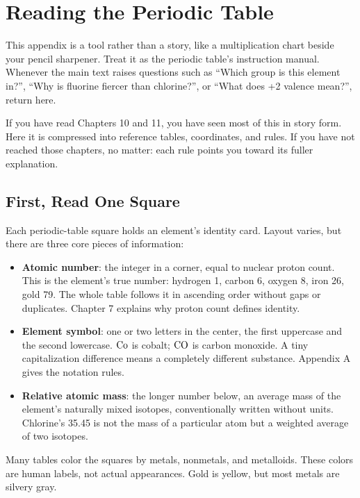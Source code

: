 \chapter{Reading the Periodic Table}

\begin{kaichang}
This appendix is a tool rather than a story, like a multiplication chart beside your pencil sharpener. Treat it as the periodic table's instruction manual. Whenever the main text raises questions such as ``Which group is this element in?'', ``Why is fluorine fiercer than chlorine?'', or ``What does +2 valence mean?'', return here.

If you have read Chapters 10 and 11, you have seen most of this in story form. Here it is compressed into reference tables, coordinates, and rules. If you have not reached those chapters, no matter: each rule points you toward its fuller explanation.
\end{kaichang}

\section{First, Read One Square}

Each periodic-table square holds an element's identity card. Layout varies, but there are three core pieces of information:

\begin{itemize}[itemsep=2pt]
\item \textbf{Atomic number}: the integer in a corner, equal to nuclear proton count. This is the element's true number: hydrogen 1, carbon 6, oxygen 8, iron 26, gold 79. The whole table follows it in ascending order without gaps or duplicates. Chapter 7 explains why proton count defines identity.
\item \textbf{Element symbol}: one or two letters in the center, the first uppercase and the second lowercase. $\mathrm{Co}$ is cobalt; $\mathrm{CO}$ is carbon monoxide. A tiny capitalization difference means a completely different substance. Appendix A gives the notation rules.
\item \textbf{Relative atomic mass}: the longer number below, an average mass of the element's naturally mixed isotopes, conventionally written without units. Chlorine's 35.45 is not the mass of a particular atom but a weighted average of two isotopes.
\end{itemize}

Many tables color the squares by metals, nonmetals, and metalloids. These colors are human labels, not actual appearances. Gold is yellow, but most metals are silvery gray.

